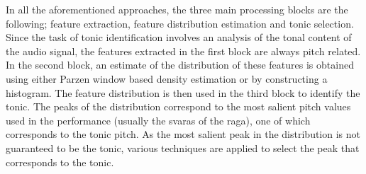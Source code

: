 In all the aforementioned approaches, the three main processing blocks are the following; feature extraction, feature distribution estimation and tonic selection. Since the task of tonic identification involves an analysis of the tonal content of the audio signal, the features extracted in the first block are always pitch related. In the second block, an estimate of the distribution of these features is obtained using either Parzen window based density estimation or by constructing a histogram. The feature distribution is then used in the third block to identify the tonic. The peaks of the distribution correspond to the most salient pitch values used in the performance (usually the \glspl{svara} of the \gls{raga}), one of which corresponds to the tonic pitch. As the most salient peak in the distribution is not guaranteed to be the tonic, various techniques are applied to select the peak that corresponds to the tonic.



